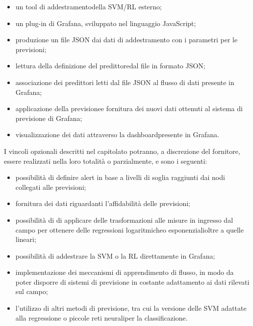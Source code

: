 	 	\begin{itemize}
			\item un tool di addestramento\glo della SVM/RL esterno;
	 		\item un plug-in di Grafana, sviluppato nel linguaggio JavaScript;
	 		\item produzione un file JSON dai dati di addestramento con i parametri per le previsioni;
			\item lettura della definizione del predittore\glo dal file in formato JSON;
			\item associazione dei predittori letti dal file JSON al flusso di dati presente in Grafana; 
			\item applicazione della previsione\glo e fornitura dei nuovi dati ottenuti al sistema di previsione di Grafana;
			\item visualizzazione dei dati attraverso la dashboard\glo presente in Grafana.
	 	\end{itemize}

	 	I vincoli opzionali descritti nel capitolato potranno, a discrezione del fornitore, essere realizzati nella loro totalità o parzialmente, e sono i seguenti:
		\begin{itemize}
			\item possibilità di definire alert in base a livelli di soglia raggiunti dai nodi collegati alle previsioni;
			\item fornitura dei dati riguardanti l’affidabilità delle previsioni;
			\item possibilità di di applicare delle trasformazioni alle misure in ingresso dal campo per ottenere delle regressioni logaritmiche\glo o esponenziali\glo oltre a quelle lineari;
			\item possibilità di addestrare la SVM o la RL direttamente in Grafana;
			\item implementazione dei meccanismi di apprendimento di flusso, in modo da poter disporre di sistemi di previsione in costante adattamento ai dati rilevati sul campo;
			\item l’utilizzo di altri metodi di previsione, tra cui la versione delle SVM adattate alla regressione o piccole reti neurali\glo per la classificazione\glo.

		\end{itemize}